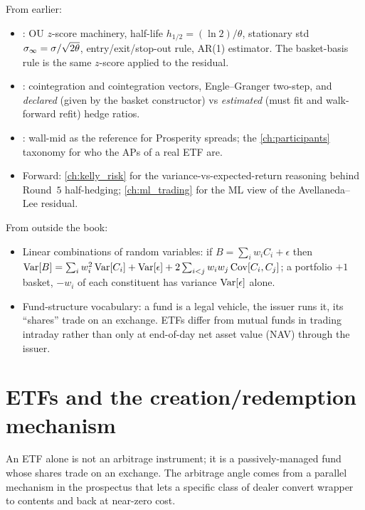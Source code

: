 \begin{backgroundbox}[Prerequisites]
From earlier:
\begin{itemize}
  \item {}: OU $z$-score machinery,
  half-life $h_{1/2} = (\ln 2)/\theta$, stationary std
  $\sigma_\infty = \sigma/\sqrt{2\theta}$, entry/exit/stop-out
  rule, AR(1) estimator. The basket-basis rule is the same
  $z$-score applied to the residual.
  \item {}: cointegration and
  cointegration vectors, Engle--Granger two-step, and
  \emph{declared} (given by the basket constructor) vs
  \emph{estimated} (must fit and walk-forward refit) hedge ratios.
  \item {}: wall-mid as the reference for
  Prosperity spreads; the \cref{ch:participants} taxonomy for who
  the APs of a real ETF are.
  \item Forward: \cref{ch:kelly_risk} for the
  variance-vs-expected-return reasoning behind Round~$5$
  half-hedging; \cref{ch:ml_trading} for the ML view of the
  Avellaneda--Lee residual.
\end{itemize}
From outside the book:
\begin{itemize}
  \item Linear combinations of random variables: if
  $B = \sum_i w_i C_i + \epsilon$ then
  $\operatorname{Var}[B] = \sum_i w_i^2 \operatorname{Var}[C_i] + \operatorname{Var}[\epsilon] +
  2 \sum_{i<j} w_i w_j \operatorname{Cov}[C_i, C_j]$; a portfolio $+1$ basket,
  $-w_i$ of each constituent has variance $\operatorname{Var}[\epsilon]$ alone.
  \item Fund-structure vocabulary: a fund is a legal vehicle, the
  issuer runs it, its ``shares'' trade on an exchange. ETFs
  differ from mutual funds in trading intraday rather than only
  at end-of-day net asset value (NAV) through the issuer.
\end{itemize}
\end{backgroundbox}

\section{ETFs and the creation/redemption mechanism}
\label{sec:ch11_creation_redemption}

An ETF alone is not an arbitrage instrument; it is a
passively-managed fund whose shares trade on an exchange. The
arbitrage angle comes from a parallel mechanism in the prospectus
that lets a specific class of dealer convert wrapper to contents
and back at near-zero cost.

